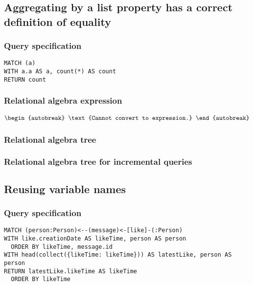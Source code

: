 
\subsection{Aggregating by a list property has a correct definition of equality}

\subsubsection*{Query specification}

\begin{lstlisting}
MATCH (a)
WITH a.a AS a, count(*) AS count
RETURN count
\end{lstlisting}

\subsubsection*{Relational algebra expression}

\begin{align*}
\begin{autobreak}
\text{Cannot convert to expression.}
\end{autobreak}
\end{align*}

\subsubsection*{Relational algebra tree}


\subsubsection*{Relational algebra tree for incremental queries}


\subsection{Reusing variable names}

\subsubsection*{Query specification}

\begin{lstlisting}
MATCH (person:Person)<--(message)<-[like]-(:Person)
WITH like.creationDate AS likeTime, person AS person
  ORDER BY likeTime, message.id
WITH head(collect({likeTime: likeTime})) AS latestLike, person AS person
RETURN latestLike.likeTime AS likeTime
  ORDER BY likeTime
\end{lstlisting}

